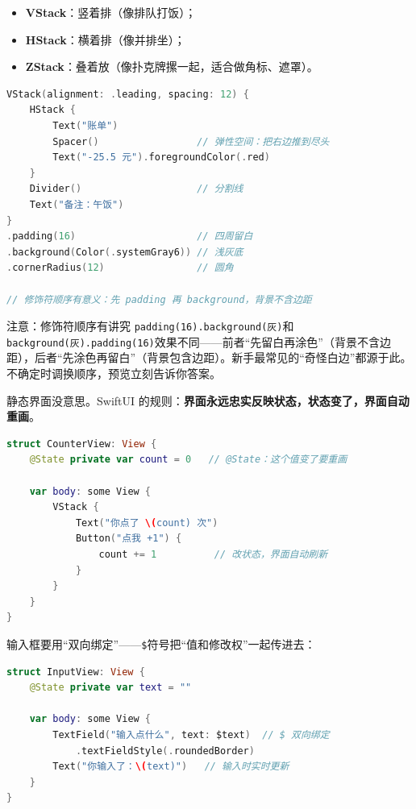 
\begin{itemize}
  \item \textbf{VStack}：竖着排（像排队打饭）；
  \item \textbf{HStack}：横着排（像并排坐）；
  \item \textbf{ZStack}：叠着放（像扑克牌摞一起，适合做角标、遮罩）。
\end{itemize}

\begin{lstlisting}[language=Swift]
VStack(alignment: .leading, spacing: 12) {
    HStack {
        Text("账单")
        Spacer()                 // 弹性空间：把右边推到尽头
        Text("-25.5 元").foregroundColor(.red)
    }
    Divider()                    // 分割线
    Text("备注：午饭")
}
.padding(16)                     // 四周留白
.background(Color(.systemGray6)) // 浅灰底
.cornerRadius(12)                // 圆角

// 修饰符顺序有意义：先 padding 再 background，背景不含边距
\end{lstlisting}

\begin{tcbwarn}{注意：修饰符顺序有讲究}
\texttt{padding(16).\allowbreak background(灰)}和\texttt{background(灰).\allowbreak padding(16)}效果不同——前者“先留白再涂色”（背景不含边距），后者“先涂色再留白”（背景包含边距）。新手最常见的“奇怪白边”都源于此。不确定时调换顺序，预览立刻告诉你答案。

\end{tcbwarn}


静态界面没意思。SwiftUI 的规则：\textbf{界面永远忠实反映状态，状态变了，界面自动重画}。

\begin{lstlisting}[language=Swift]
struct CounterView: View {
    @State private var count = 0   // @State：这个值变了要重画

    var body: some View {
        VStack {
            Text("你点了 \(count) 次")
            Button("点我 +1") {
                count += 1          // 改状态，界面自动刷新
            }
        }
    }
}
\end{lstlisting}

输入框要用“双向绑定”——\texttt{\$}符号把“值和修改权”一起传进去：

\begin{lstlisting}[language=Swift]
struct InputView: View {
    @State private var text = ""

    var body: some View {
        TextField("输入点什么", text: $text)  // $ 双向绑定
            .textFieldStyle(.roundedBorder)
        Text("你输入了：\(text)")   // 输入时实时更新
    }
}
\end{lstlisting}

